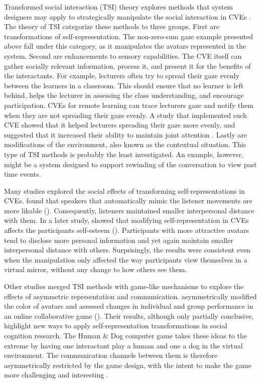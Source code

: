 \documentclass[]{simple-thesis}
\begin{document}
Transformed social interaction (TSI) theory explores methods that system designers may apply to strategically manipulate the social interaction in CVEs \citep{Bailenson2004}.
The theory of TSI categorize these methods to three groups.
First are transformations of self-representation.
The non-zero-sum gaze example presented above fall under this category, as it manipulates the avatars represented in the system.
Second are enhancements to sensory capabilities.
The CVE itself can gather socially relevant information, process it, and present it for the benefits of the interactants.
For example, lecturers often try to spread their gaze evenly between the learners in a classroom.
This should ensure that no learner is left behind, helps the lecturer in assessing the class understanding, and encourage participation.
CVEs for remote learning can trace lecturers gaze and notify them when they are not spreading their gaze evenly.
A study that implemented such CVE showed that it helped lecturers spreading their gaze more evenly, and suggested that it increased their ability to maintain joint attention \citep{Bailenson2008b}.
Lastly are modifications of the environment, also known as the contextual situation.
This type of TSI methods is probably the least investigated.
An example, however, might be a system designed to support rewinding of the conversation to view past time events.

Many studies explored the social effects of transforming self-representations in CVEs.
\citeauthor{Bailenson2005} found that speakers that automatically mimic the listener movements are more likable (\citeyear{Bailenson2005}).
Consequently, listeners maintained smaller interpersonal distance with them.
In a later study, \citeauthor{Bailenson2008a} showed that modifying self-representation in CVEs affects the participants self-esteem (\citeyear{Bailenson2008a}).
Participants with more attractive avatars tend to disclose more personal information and yet again maintain smaller interpersonal distance with others.
Surprisingly, the results were consistent even when the manipulation only affected the way participants view themselves in a virtual mirror, without any change to how others see them.

Other studies merged TSI methods with game-like mechanisms to explore the effects of asymmetric representation and communication.
\citeauthor{Dominguez2014} asymmetrically modified the color of avatars and assessed changes in individual and group performance in an online collaborative game (\citeyear{Dominguez2014}).
Their results, although only partially conclusive, highlight new ways to apply self-representation transformations in social cognition research.
The Human \& Dog computer game takes these ideas to the extreme by having one interactant play a human and one a dog in the virtual environment.
The communication channels between them is therefore asymmetrically restricted by the game design, with the intent to make the game more challenging and interesting \citep{Chou2016, Hou2017}.
\end{document}
